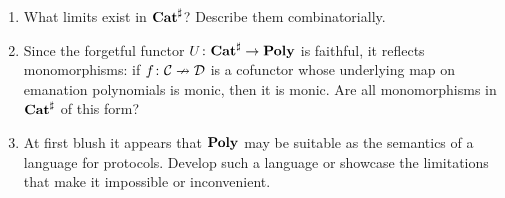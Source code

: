 \documentclass[DynamicalBook]{subfiles}
\begin{document}
\begin{enumerate}
  \item What limits exist in $\textbf{Cat}^\sharp$? Describe them combinatorially.
  \item Since the forgetful functor $U\colon\textbf{Cat}^\sharp\to\textbf{Poly}$ is faithful, it reflects monomorphisms: if $f\colon\mathcal{C}\nrightarrow\mathcal{D}$ is a cofunctor whose underlying map on emanation polynomials is monic, then it is monic. Are all monomorphisms in $\textbf{Cat}^\sharp$ of this form?
  \item At first blush it appears that $\textbf{Poly}$ may be suitable as the semantics of a language for protocols. Develop such a language or showcase the limitations that make it impossible or inconvenient.
\end{enumerate}
\end{document}
